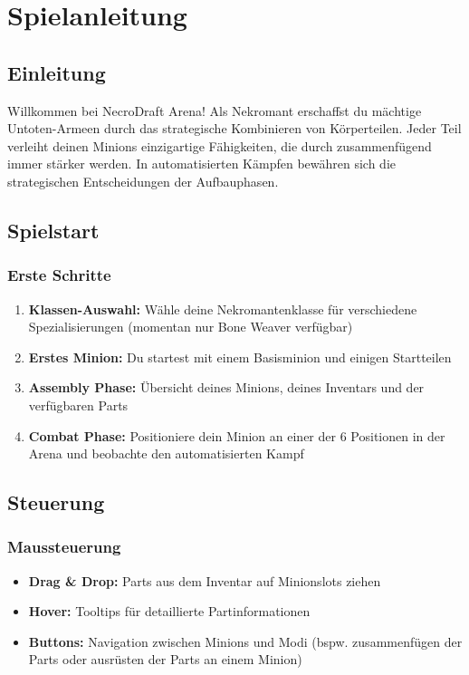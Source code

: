 \chapter{Spielanleitung}
\label{chap:spielanleitung}

\section{Einleitung}

Willkommen bei NecroDraft Arena! Als Nekromant erschaffst du mächtige Untoten-Armeen durch das strategische Kombinieren von Körperteilen. 
Jeder Teil verleiht deinen Minions einzigartige Fähigkeiten, die durch zusammenfügend immer stärker werden.
In automatisierten Kämpfen bewähren sich die strategischen Entscheidungen der Aufbauphasen.

\section{Spielstart}

\subsection{Erste Schritte}
\begin{enumerate}
    \item \textbf{Klassen-Auswahl:} Wähle deine Nekromantenklasse für verschiedene Spezialisierungen (momentan nur Bone Weaver verfügbar)
    \item \textbf{Erstes Minion:} Du startest mit einem Basisminion und einigen Startteilen
    \item \textbf{Assembly Phase:} Übersicht deines Minions, deines Inventars und der verfügbaren Parts
    \item \textbf{Combat Phase:} Positioniere dein Minion an einer der 6 Positionen in der Arena und beobachte den automatisierten Kampf
\end{enumerate}

\section{Steuerung}

\subsection{Maussteuerung}
\begin{itemize}
    \item \textbf{Drag \& Drop:} Parts aus dem Inventar auf Minionslots ziehen
    \item \textbf{Hover:} Tooltips für detaillierte Partinformationen
    \item \textbf{Buttons:} Navigation zwischen Minions und Modi (bspw. zusammenfügen der Parts oder ausrüsten der Parts an einem Minion)
\end{itemize}

